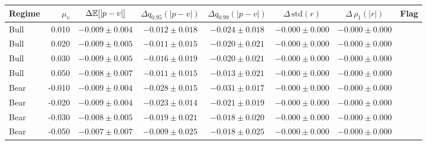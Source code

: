 \begin{tabular}{lrcccccc}
\hline
Regime & $\mu_v$ & $\Delta\mathbb{E}[|p-v|]$ & $\Delta q_{0.95}(|p-v|)$ & $\Delta q_{0.99}(|p-v|)$ & $\Delta\,\mathrm{std}(r)$ & $\Delta\,\rho_1(|r|)$ & Flag \\
\hline
Bull & 0.010 & $-0.009\pm0.004$ & $-0.012\pm0.018$ & $-0.024\pm0.018$ & $-0.000\pm0.000$ & $-0.000\pm0.000$ &  \\
Bull & 0.020 & $-0.009\pm0.005$ & $-0.011\pm0.015$ & $-0.020\pm0.021$ & $-0.000\pm0.000$ & $-0.000\pm0.000$ &  \\
Bull & 0.030 & $-0.009\pm0.005$ & $-0.016\pm0.019$ & $-0.020\pm0.021$ & $-0.000\pm0.000$ & $-0.000\pm0.000$ &  \\
Bull & 0.050 & $-0.008\pm0.007$ & $-0.011\pm0.015$ & $-0.013\pm0.021$ & $-0.000\pm0.000$ & $-0.000\pm0.000$ &  \\
Bear & -0.010 & $-0.009\pm0.004$ & $-0.028\pm0.015$ & $-0.031\pm0.017$ & $-0.000\pm0.000$ & $-0.000\pm0.000$ &  \\
Bear & -0.020 & $-0.009\pm0.004$ & $-0.023\pm0.014$ & $-0.021\pm0.019$ & $-0.000\pm0.000$ & $-0.000\pm0.000$ &  \\
Bear & -0.030 & $-0.008\pm0.005$ & $-0.019\pm0.021$ & $-0.018\pm0.020$ & $-0.000\pm0.000$ & $-0.000\pm0.000$ &  \\
Bear & -0.050 & $-0.007\pm0.007$ & $-0.009\pm0.025$ & $-0.018\pm0.025$ & $-0.000\pm0.000$ & $-0.000\pm0.000$ &  \\
\hline
\end{tabular}
